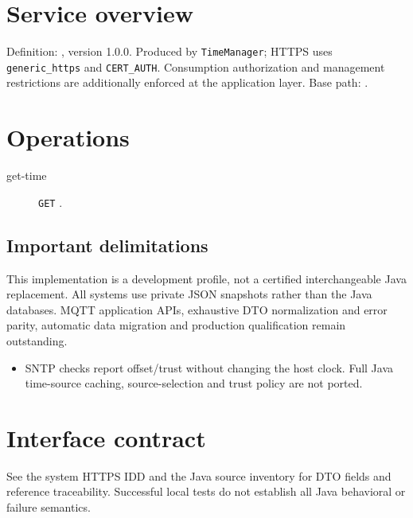\documentclass[a4paper]{arrowhead}
\begin{document}
\ArrowheadSetup
\section{Service overview}
Definition: , version 1.0.0. Produced by \texttt{TimeManager}; HTTPS uses \texttt{generic\_https} and \texttt{CERT\_AUTH}. Consumption authorization and management restrictions are additionally enforced at the application layer. Base path: .
\section{Operations}
\begin{description}
\item[get-time] \texttt{GET} .
\end{description}
\subsection{Important delimitations}
This implementation is a development profile, not a certified interchangeable Java replacement. All systems use private JSON snapshots rather than the Java databases. MQTT application APIs, exhaustive DTO normalization and error parity, automatic data migration and production qualification remain outstanding.
\begin{itemize}
\item SNTP checks report offset/trust without changing the host clock. Full Java time-source caching, source-selection and trust policy are not ported.
\end{itemize}
\section{Interface contract}
See the system HTTPS IDD and the Java source inventory for DTO fields and reference traceability. Successful local tests do not establish all Java behavioral or failure semantics.
\end{document}
